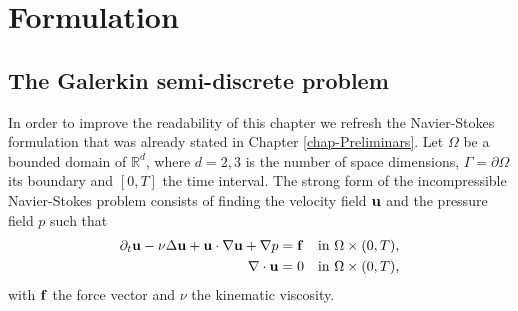 

\section{Formulation}
\label{sec-C4_formulation}
\subsection{The Galerkin semi-discrete problem}
\label{subsec-C4_C4_NS_formulation}
In order to improve the readability of this chapter we refresh the Navier-Stokes formulation that was already stated in Chapter \ref{chap-Preliminars}. 
Let $\Omega$ be a bounded domain of $\mathbb{R}^d$, where $d=2,3$ is the number of space dimensions, $\Gamma=\partial\Omega$ its boundary and $[0,T]$ the time interval. The strong form of the incompressible Navier-Stokes problem consists of finding the velocity field ${\bf u}$ and the pressure field $p$ such that 
\begin{align}
\label{eq-C4_NS_strong_mome}
\partial_t{\bf u}-\nu\Delta{\bf u}+{\bf u}\cdot\nabla{\bf u}+\nabla p&={\bf f}&\mbox{in $\Omega\times(0,T)$,}\\
\label{eq-C4_NS_strong_inc}
\nabla\cdot{\bf u}&=0&\mbox{in $\Omega\times(0,T)$,}
\end{align}
with ${\bf f}$ the force vector and $\nu$ the kinematic viscosity. 

